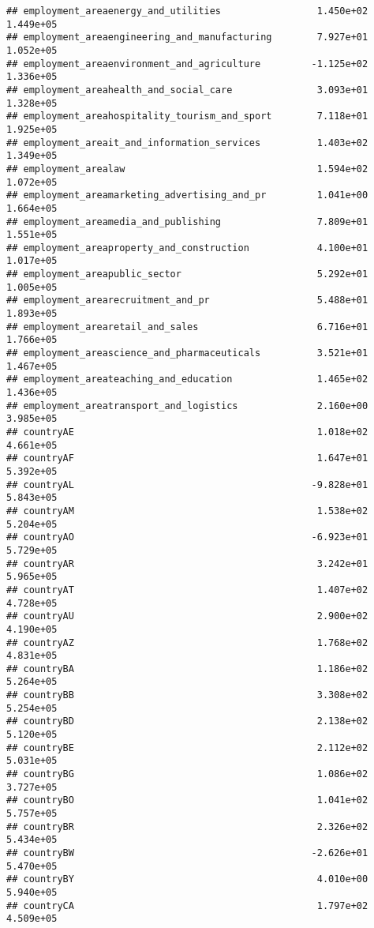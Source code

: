 \documentclass[
]{article}
\begin{document}
\begin{verbatim}
## employment_areaenergy_and_utilities                 1.450e+02  1.449e+05
## employment_areaengineering_and_manufacturing        7.927e+01  1.052e+05
## employment_areaenvironment_and_agriculture         -1.125e+02  1.336e+05
## employment_areahealth_and_social_care               3.093e+01  1.328e+05
## employment_areahospitality_tourism_and_sport        7.118e+01  1.925e+05
## employment_areait_and_information_services          1.403e+02  1.349e+05
## employment_arealaw                                  1.594e+02  1.072e+05
## employment_areamarketing_advertising_and_pr         1.041e+00  1.664e+05
## employment_areamedia_and_publishing                 7.809e+01  1.551e+05
## employment_areaproperty_and_construction            4.100e+01  1.017e+05
## employment_areapublic_sector                        5.292e+01  1.005e+05
## employment_arearecruitment_and_pr                   5.488e+01  1.893e+05
## employment_arearetail_and_sales                     6.716e+01  1.766e+05
## employment_areascience_and_pharmaceuticals          3.521e+01  1.467e+05
## employment_areateaching_and_education               1.465e+02  1.436e+05
## employment_areatransport_and_logistics              2.160e+00  3.985e+05
## countryAE                                           1.018e+02  4.661e+05
## countryAF                                           1.647e+01  5.392e+05
## countryAL                                          -9.828e+01  5.843e+05
## countryAM                                           1.538e+02  5.204e+05
## countryAO                                          -6.923e+01  5.729e+05
## countryAR                                           3.242e+01  5.965e+05
## countryAT                                           1.407e+02  4.728e+05
## countryAU                                           2.900e+02  4.190e+05
## countryAZ                                           1.768e+02  4.831e+05
## countryBA                                           1.186e+02  5.264e+05
## countryBB                                           3.308e+02  5.254e+05
## countryBD                                           2.138e+02  5.120e+05
## countryBE                                           2.112e+02  5.031e+05
## countryBG                                           1.086e+02  3.727e+05
## countryBO                                           1.041e+02  5.757e+05
## countryBR                                           2.326e+02  5.434e+05
## countryBW                                          -2.626e+01  5.470e+05
## countryBY                                           4.010e+00  5.940e+05
## countryCA                                           1.797e+02  4.509e+05

\end{verbatim}
\end{document}
